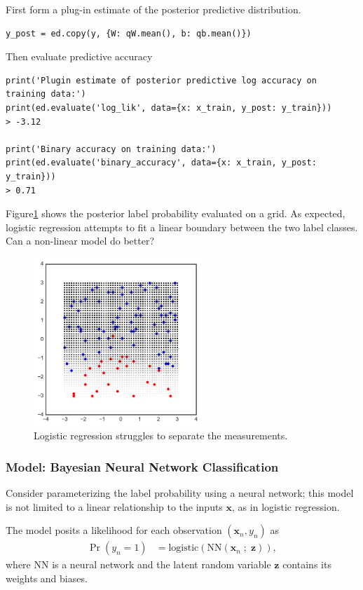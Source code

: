 First form a plug-in estimate of the posterior predictive distribution.
\begin{lstlisting}
y_post = ed.copy(y, {W: qW.mean(), b: qb.mean()})
\end{lstlisting}

Then evaluate predictive accuracy
\begin{lstlisting}
print('Plugin estimate of posterior predictive log accuracy on training data:')
print(ed.evaluate('log_lik', data={x: x_train, y_post: y_train}))
> -3.12

print('Binary accuracy on training data:')
print(ed.evaluate('binary_accuracy', data={x: x_train, y_post: y_train}))
> 0.71
\end{lstlisting}

Figure\nobreakspace \ref {fig:lr_linear} shows the posterior label probability evaluated on a grid.
As expected, logistic regression attempts to fit a linear boundary between the
two label classes. Can a non-linear model do better?
\begin{figure}[!htb]
\centering
\includegraphics[width=2.5in]{images/lr_linear.pdf}
\caption{Logistic regression struggles to separate the measurements.}
\label{fig:lr_linear}
\end{figure}

\subsubsection{Model: Bayesian Neural Network Classification}

Consider parameterizing the label probability using a neural network; this
model is not limited to a linear relationship to the inputs $\mathbf{x}$, as in
logistic regression.

The model posits a likelihood for each observation $(\mathbf{x}_n,
y_n)$ as
\begin{align*}
\Pr(y_n=1)
  &=
  \text{logistic}
  \left(
  \text{NN}(\mathbf{x}_n \;;\; \mathbf{z})
  \right),
\end{align*}
where NN is a neural network and the latent random variable $\mathbf{z}$
contains its weights and biases.

